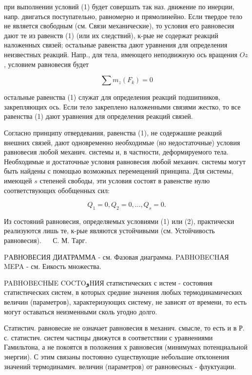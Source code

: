 \documentclass[10pt]{article}
\begin{document}
при выполнении условий (1) будет совершать так наз. движение по инерции, напр. двигаться поступательно, равномерно и прямолинейно. Если твердое тело не является свободным (см. Связи механические), то условия его равновесия дают те из равенств (1) (или их следствий), к-рые не содержат реакций наложенных связей; остальные равенства дают уравнения для определения неизвестных реакций. Напр., для тела, имеющего неподвижную ось вращения $O z$, условием равновесия будет



\[

\sum m_{z}\left(F_{k}\right)=0

\]



остальные равенства (1) служат для определения реакций подшипников, закрепляющих ось. Если тело закреплено наложенными связями жестко, то все равенства (1) дают уравнения для определения реакций связей.



Согласно принципу отвердевания, равенства (1), не содержашие реакций внешних связей, дают одновременно необходимые (но недостаточные) условия равновесия любой механич. системы и, в частности, деформируемого тела. Необходимые и достаточные условия равновесия любой механич. системы могут быть найдены с помощью возможных перемещений принципа. Для системы, имеющей $s$ степеней свободы, эти условия состоят в равенстве нулю соответствующих обобщенных сил:



\[

Q_{1}=0, Q_{2}=0, \ldots, Q_{s}=0 .

\]



Из состояний равновесия, определяемых условиями (1) или (2), практически реализуются лишь те, к-рые являются устойчивыми (см. Устойчивость равновесия). $\quad$ С. М. Тарг.



PАВНОВЕСИЯ ДИАТРАММА - см. Фазовая диаграмма. PABHOBECHАЯ MEPA - см. Еикость множества.



PABHOBECHЫE COCTOوHИЯ статистических с истем - состояния статистических систем, в которых средние значения любых термодинамических величин (параметров), характеризующих систему, не зависят от времени, то есть могут оставаться неизменными сколь угодно долго.



Статистич. равновесие не означает равновесия в механич. смысле, то есть и в Р. с. статистич. систем частицы движутся в соответствии с уравнениями Гамильтона, а не покоятся в положения х равновесия (минимумах потенциальной энергии). С этим связаны постоянно существующие небольшие отклонения значений термодинамич. величин (параметров) от равновесных - флуктуации.
\end{document}
